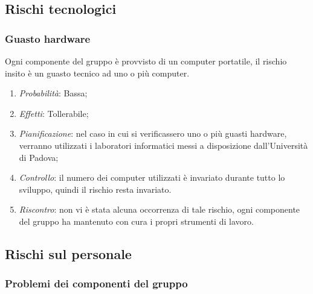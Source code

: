 	\subsection{Rischi tecnologici}
	
		\subsubsection{Guasto hardware}
		
Ogni componente del gruppo è provvisto di un computer portatile, il rischio insito è un guasto tecnico ad uno o più computer.
\begin{enumerate}
\item \textit{Probabilità}: Bassa;
\item \textit{Effetti}: Tollerabile;
\item \textit{Pianificazione}: nel caso in cui si verificassero uno o più guasti hardware, verranno utilizzati i laboratori informatici messi a disposizione dall'Università di Padova;
\item \textit{Controllo}: il numero dei computer utilizzati è invariato durante tutto lo sviluppo, quindi il rischio resta invariato.
\item \textit{Riscontro}: non vi è stata alcuna occorrenza di tale rischio, ogni componente del gruppo ha mantenuto con cura i propri strumenti di lavoro.
\end{enumerate}	
	
	
	\subsection{Rischi sul personale}
		\subsubsection{Problemi dei componenti del gruppo}
		
